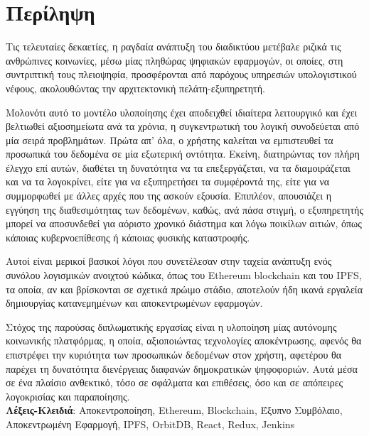 \chapter*{Περίληψη}
Τις τελευταίες δεκαετίες, η ραγδαία ανάπτυξη του διαδικτύου μετέβαλε ριζικά τις ανθρώπινες
κοινωνίες, μέσω μίας πληθώρας ψηφιακών εφαρμογών, οι οποίες, στη συντριπτική τους πλειοψηφία, προσφέρονται από παρόχους υπηρεσιών υπολογιστικού νέφους, ακολουθώντας την αρχιτεκτονική πελάτη-εξυπηρετητή.

Μολονότι αυτό το μοντέλο υλοποίησης έχει αποδειχθεί ιδιαίτερα λειτουργικό και έχει βελτιωθεί αξιοσημείωτα ανά τα χρόνια, η συγκεντρωτική του λογική συνοδεύεται από μία σειρά προβλημάτων. Πρώτα απ' όλα, ο χρήστης καλείται να εμπιστευθεί τα προσωπικά του δεδομένα σε μία εξωτερική οντότητα. Εκείνη, διατηρώντας τον πλήρη έλεγχο επί αυτών, διαθέτει τη δυνατότητα να τα επεξεργάζεται, να τα διαμοιράζεται και να τα λογοκρίνει, είτε για να εξυπηρετήσει τα συμφέροντά της, είτε για να συμμορφωθεί με άλλες αρχές που της ασκούν εξουσία. Επιπλέον, απουσιάζει η εγγύηση της διαθεσιμότητας των δεδομένων, καθώς, ανά πάσα στιγμή, ο εξυπηρετητής μπορεί να αποσυνδεθεί για αόριστο χρονικό διάστημα και λόγω ποικίλων αιτιών, όπως κάποιας κυβερνοεπίθεσης ή κάποιας φυσικής καταστροφής.

Αυτοί είναι μερικοί βασικοί λόγοι που συνετέλεσαν στην ταχεία ανάπτυξη ενός συνόλου λογισμικών ανοιχτού κώδικα, όπως του Ethereum blockchain και του IPFS, τα οποία, αν και βρίσκονται σε σχετικά πρώιμο στάδιο, αποτελούν ήδη ικανά εργαλεία δημιουργίας κατανεμημένων και αποκεντρωμένων εφαρμογών.

Στόχος της παρούσας διπλωματικής εργασίας είναι η υλοποίηση μίας αυτόνομης κοινωνικής πλατφόρμας,
η οποία, αξιοποιώντας τεχνολογίες αποκέντρωσης, αφενός θα επιστρέφει την κυριότητα των προσωπικών
δεδομένων στον χρήστη, αφετέρου θα παρέχει τη δυνατότητα διενέργειας διαφανών δημοκρατικών ψηφοφοριών. Αυτά μέσα σε ένα πλαίσιο ανθεκτικό, τόσο σε σφάλματα και επιθέσεις, όσο και σε απόπειρες λογοκρισίας και παραποίησης.
\\[2\baselineskip]
\textbf{Λέξεις-Κλειδιά}: Αποκεντροποίηση, Ethereum, Blockchain, Έξυπνο Συμβόλαιο, Αποκεντρωμένη Εφαρμογή, IPFS, OrbitDB, React, Redux, Jenkins